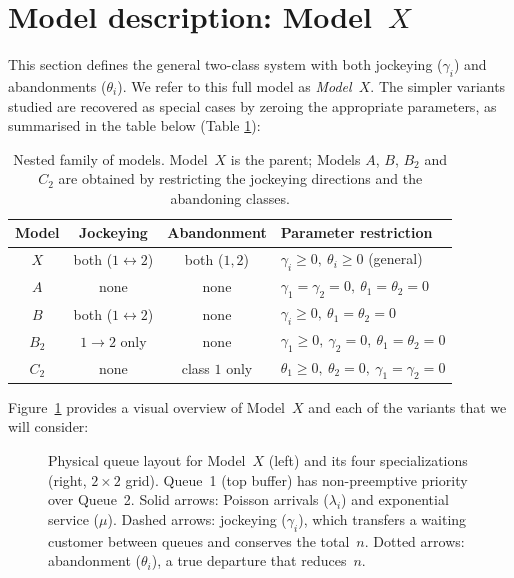 \section{Model description: Model~\texorpdfstring{$X$}{X}}\label{sec:model_x}

This section defines the general two-class system with both jockeying ($\gamma_i$) and abandonments ($\theta_i$). We refer to this full model as \emph{Model~$X$}. The simpler variants studied are recovered as special cases by zeroing the appropriate parameters, as summarised in the table below (Table \ref{tab:model_family}):
\begin{table}[H]
    \centering
    \begin{tabular}{cccl}
        \hline
        Model & Jockeying & Abandonment & Parameter restriction \\
        \hline
        $X$  & both ($1\!\leftrightarrow\!2$) & both ($1,2$)       & $\gamma_i \geq 0,\ \theta_i \geq 0$ \quad (general) \\
        $A$  & none                            & none               & $\gamma_1=\gamma_2=0,\ \theta_1=\theta_2=0$ \\
        $B$  & both ($1\!\leftrightarrow\!2$) & none               & $\gamma_i \geq 0,\ \theta_1=\theta_2=0$ \\
        $B_2$ & $1\!\to\!2$ only                & none               & $\gamma_1 \geq 0,\ \gamma_2=0,\ \theta_1=\theta_2=0$ \\
        $C_2$ & none                            & class $1$ only     & $\theta_1 \geq 0,\ \theta_2=0,\ \gamma_1=\gamma_2=0$ \\
        \hline
    \end{tabular}
    \caption{Nested family of models. Model~$X$ is the parent; Models $A$, $B$, $B_2$ and $C_2$
    are obtained by restricting the jockeying directions and the abandoning classes.}
    \label{tab:model_family}
\end{table}

Figure~\ref{fig:models-queue-overview} provides a visual overview of Model~$X$ and each of the variants that we will consider:
\begin{figure}[H]
    \centering
    \resizebox{\textwidth}{!}{%
    }
    \caption{Physical queue layout for Model~$X$ (left) and its four specializations
    (right, $2\times2$ grid). Queue~1 (top buffer) has non-preemptive priority over Queue~2.
    Solid arrows: Poisson arrivals ($\lambda_i$) and exponential service ($\mu$).
    Dashed arrows: jockeying ($\gamma_i$), which transfers a waiting customer between
    queues and conserves the total~$n$.
    Dotted arrows: abandonment ($\theta_i$), a true departure that reduces~$n$.}
    \label{fig:models-queue-overview}
\end{figure}

